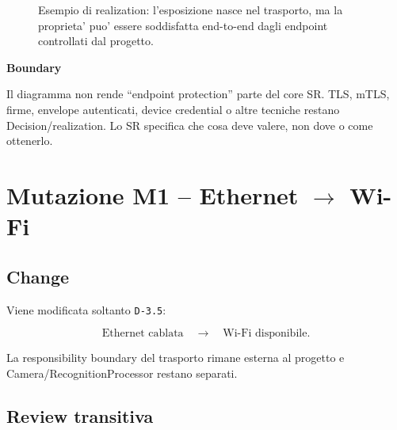 \documentclass[11pt,a4paper]{article}
\newenvironment{warningbox}[1]{%
  \def\FrameCommand{\fcolorbox{ddtaorange}{ddtagray}}%
  \MakeFramed{\advance\hsize-2\width\FrameRestore}
  \noindent\textbf{#1}\par\smallskip
}{\endMakeFramed}
\begin{document}
\begin{figure}[h]
\centering
{}
\caption{Esempio di realization: l'esposizione nasce nel trasporto, ma la proprieta' puo' essere soddisfatta end-to-end dagli endpoint controllati dal progetto.}
\end{figure}

\begin{warningbox}{Boundary}
Il diagramma non rende ``endpoint protection'' parte del core SR. TLS, mTLS, firme, envelope autenticati, device credential o altre tecniche restano Decision/realization. Lo SR specifica che cosa deve valere, non dove o come ottenerlo.
\end{warningbox}

\section{Mutazione M1 -- Ethernet $\rightarrow$ Wi-Fi}

\subsection{Change}

Viene modificata soltanto \texttt{D-3.5}:

\[
\text{Ethernet cablata} \quad\longrightarrow\quad \text{Wi-Fi disponibile}.
\]

La responsibility boundary del trasporto rimane esterna al progetto e Camera/RecognitionProcessor restano separati.

\subsection{Review transitiva}
\end{document}
